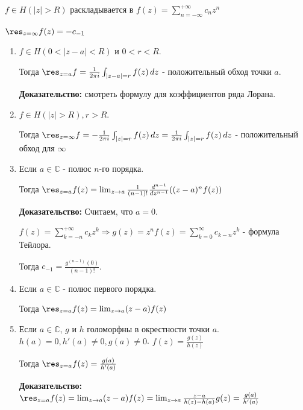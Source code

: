 \begin{definition}
    $f \in H(|z| > R)$ раскладывается в $f(z) = \sum_{n = -\infty}^{+\infty} c_n z^n$

    $\res_{z = \infty} f(z) = -c_{-1}$
\end{definition}

\begin{properties}
    \begin{enumerate}
        \item $f \in H(0 < |z - a| < R)$ и $0 < r < R$.
        
        Тогда $\res_{z = a} f = \frac{1}{2\pi i} \int_{|z - a| = r} f(z) \, dz$ - положительный обход
        точки $a$.

        \textbf{Доказательство:} смотреть формулу для коэффициентов ряда Лорана.

        \item $f \in H(|z| > R), r > R$.
        
        Тогда $\res_{z = \infty} f = -\frac{1}{2\pi i} \int_{|z| = r} f(z) \, dz = \frac{1}{2\pi i} \int_{|z| = r} f(z) \, dz$ - 
        положительный обход для $\infty$

        \item Если $a \in \mathbb{C}$ - полюс $n$-го порядка. 
        
        Тогда $\res_{z = a} f(z) = \lim_{z \to a} \frac{1}{(n - 1)!} \frac{d^{n - 1}}{dz^{n - 1}} ((z - a)^n f(z))$

        \textbf{Доказательство:} Считаем, что $a = 0$.

        $f(z) = \sum_{k = -n}^{+\infty} c_kz^k \Rightarrow g(z) = z^n f(z) = \sum_{k = 0}^{\infty} c_{k - n}z^k $ - формула Тейлора.

        Тогда $c_{-1} = \frac{g^{(n - 1)}(0)}{(n - 1)!}$.
        
        \item Если $a \in \mathbb{C}$ - полюс первого порядка.
        
        Тогда $\res_{z = a} f(z) = \lim_{z \to a} (z - a)f(z)$

        \item Если $a \in \mathbb{C}$, $g$ и $h$ голоморфны в окрестности точки $a$.
        $h(a) = 0, h'(a) \neq 0, g(a) \neq 0$. $f(z) = \frac{g(z)}{h(z)}$

        Тогда $\res_{z = a} f(z) = \frac{g(a)}{h'(a)}$

        \textbf{Доказательство:} $\res_{z = a} f(z) = \lim_{z \to a} (z - a)f(z) = 
        \lim_{z \to a} \frac{z - a}{h(z) - h(a)} g(z) = \frac{g(a)}{h'(a)}$


\end{enumerate}
\end{properties}
